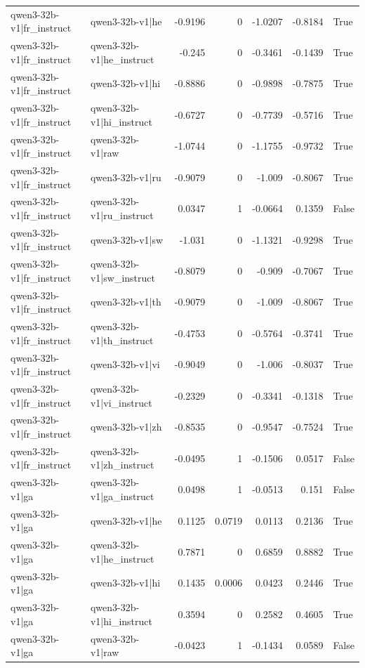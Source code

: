 \begin{table}
\begin{tabular}{l l r r r r l}
qwen3-32b-v1|fr_instruct & qwen3-32b-v1|he & -0.9196 & 0 & -1.0207 & -0.8184 & True \\
qwen3-32b-v1|fr_instruct & qwen3-32b-v1|he_instruct & -0.245 & 0 & -0.3461 & -0.1439 & True \\
qwen3-32b-v1|fr_instruct & qwen3-32b-v1|hi & -0.8886 & 0 & -0.9898 & -0.7875 & True \\
qwen3-32b-v1|fr_instruct & qwen3-32b-v1|hi_instruct & -0.6727 & 0 & -0.7739 & -0.5716 & True \\
qwen3-32b-v1|fr_instruct & qwen3-32b-v1|raw & -1.0744 & 0 & -1.1755 & -0.9732 & True \\
qwen3-32b-v1|fr_instruct & qwen3-32b-v1|ru & -0.9079 & 0 & -1.009 & -0.8067 & True \\
qwen3-32b-v1|fr_instruct & qwen3-32b-v1|ru_instruct & 0.0347 & 1 & -0.0664 & 0.1359 & False \\
qwen3-32b-v1|fr_instruct & qwen3-32b-v1|sw & -1.031 & 0 & -1.1321 & -0.9298 & True \\
qwen3-32b-v1|fr_instruct & qwen3-32b-v1|sw_instruct & -0.8079 & 0 & -0.909 & -0.7067 & True \\
qwen3-32b-v1|fr_instruct & qwen3-32b-v1|th & -0.9079 & 0 & -1.009 & -0.8067 & True \\
qwen3-32b-v1|fr_instruct & qwen3-32b-v1|th_instruct & -0.4753 & 0 & -0.5764 & -0.3741 & True \\
qwen3-32b-v1|fr_instruct & qwen3-32b-v1|vi & -0.9049 & 0 & -1.006 & -0.8037 & True \\
qwen3-32b-v1|fr_instruct & qwen3-32b-v1|vi_instruct & -0.2329 & 0 & -0.3341 & -0.1318 & True \\
qwen3-32b-v1|fr_instruct & qwen3-32b-v1|zh & -0.8535 & 0 & -0.9547 & -0.7524 & True \\
qwen3-32b-v1|fr_instruct & qwen3-32b-v1|zh_instruct & -0.0495 & 1 & -0.1506 & 0.0517 & False \\
qwen3-32b-v1|ga & qwen3-32b-v1|ga_instruct & 0.0498 & 1 & -0.0513 & 0.151 & False \\
qwen3-32b-v1|ga & qwen3-32b-v1|he & 0.1125 & 0.0719 & 0.0113 & 0.2136 & True \\
qwen3-32b-v1|ga & qwen3-32b-v1|he_instruct & 0.7871 & 0 & 0.6859 & 0.8882 & True \\
qwen3-32b-v1|ga & qwen3-32b-v1|hi & 0.1435 & 0.0006 & 0.0423 & 0.2446 & True \\
qwen3-32b-v1|ga & qwen3-32b-v1|hi_instruct & 0.3594 & 0 & 0.2582 & 0.4605 & True \\
qwen3-32b-v1|ga & qwen3-32b-v1|raw & -0.0423 & 1 & -0.1434 & 0.0589 & False \\

\end{tabular}
\end{table}
